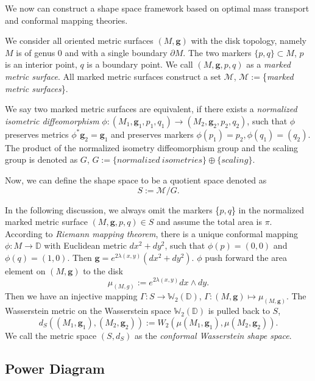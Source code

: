 \documentclass[runningheads]{llncs}
\begin{document}
We now can construct a shape space framework based on optimal mass transport and conformal mapping theories.

We consider all oriented metric surfaces $(M,\mathbf{g})$ with the disk topology, namely $M$ is of genus 0 and with a single boundary $\partial M$. The two markers $\{p,q\}\subset M$, $p$ is an interior point, $q$ is a boundary point. We call $(M,\mathbf{g},p,q)$ as a \textit{marked metric surface}. All marked metric surfaces construct a set $\mathscr{M}$, $\mathscr{M}:=$\{\textit{marked metric surfaces}\}.

We say two marked metric surfaces are equivalent, if there exists a \textit{normalized isometric diffeomorphism} $\phi:(M_1,\mathbf{g}_1,p_1,q_1)\rightarrow (M_2,\mathbf{g}_2,p_2,q_2)$, such that $\phi$ preserves metrics $\phi^*\mathbf{g}_2=\mathbf{g}_1$ and preserves markers $\phi (p_1) = p_2, \phi(q_1)=(q_2)$. The product of the normalized isometry diffeomorphism group and the scaling group is denoted as $G$, $G:=\{normalized \  isometries\}\oplus \{scaling\}$.

Now, we can define the shape space to be a quotient space denoted as $$S:=\mathscr{M}/G.$$

In the following discussion, we always omit the markers \{$p,q$\} in the normalized marked metric surface $(M,\mathbf{g},p,q)\in S$ and assume the total area is $\pi$. According to \textit{Riemann mapping theorem}, there is a unique conformal mapping $\phi:M\rightarrow \mathbb{D}$ with Euclidean metric $dx^2+dy^2$, such that $\phi(p)=(0,0)$ and $\phi(q)=(1,0)$. Then $\mathbf{g}=e^{2\lambda(x,y)}(dx^2+dy^2)$. $\phi$ push forward the area element on $(M,\mathbf{g})$  to the disk $$\mu_{(M,g)}:=e^{2\lambda(x,y)}dx\wedge dy.$$
Then we have an injective mapping $\Gamma:S\rightarrow \mathbb{W}_2(\mathbb{D})$, $\Gamma:(M,\mathbf{g})\mapsto\mu_{(M,\mathbf{g})}.$ The Wasserstein metric on the Wasserstein space $\mathbb{W}_2(\mathbb{D})$ is pulled back to $S$, $$d_S((M_1,\mathbf{g}_1),(M_2,\mathbf{g}_2)):=W_2(\mu(M_1,\mathbf{g}_1),\mu(M_2,\mathbf{g}_2)).$$
We call the metric space $(S,d_S)$ as the \textit{conformal Wasserstein shape space}.

\subsection{Power Diagram}
\end{document}
